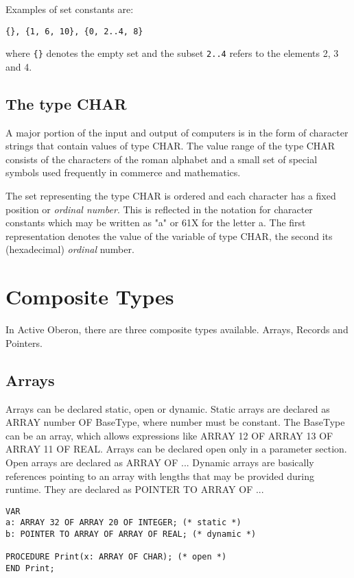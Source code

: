 \documentclass[a4paper,11pt]{article}
\begin{document}
Examples of set constants are:
\begin{lstlisting}[language=Oberon,frame=none]
{}, {1, 6, 10}, {0, 2..4, 8}
\end{lstlisting}

where \verb+{}+ denotes the empty set and the subset \verb+2..4+ refers to the elements 2, 3 and 4.

\subsection{The type CHAR}
A major portion of the input and output of computers is in the form of character strings that contain values of type CHAR. The value range of the type CHAR consists of the characters of the roman alphabet and a small set of special symbols used frequently in commerce and mathematics.

The set representing the type CHAR is ordered and each character has a fixed position or {\em ordinal number}. This is reflected in the notation for character constants which may be written as "a" or 61X for the letter a. The first representation denotes the value of the variable of type CHAR, the second its (hexadecimal) {\em ordinal} number.

\section{Composite Types}\label{section:CompositeTypes}

In Active Oberon, there are three composite types available. Arrays, Records and Pointers.

\subsection{Arrays}
Arrays can be declared static, open or dynamic. Static arrays are declared as ARRAY number OF BaseType, where number must be constant. The BaseType can be an array, which allows expressions like ARRAY 12 OF ARRAY 13 OF ARRAY 11 OF REAL. Arrays can be declared open only in a parameter section. Open arrays are declared as ARRAY OF ...  Dynamic arrays are basically references pointing to an array with lengths that may be provided during runtime. They are declared as POINTER TO ARRAY OF ...
\begin{lstlisting}[language=Oberon,frame=none]
VAR
a: ARRAY 32 OF ARRAY 20 OF INTEGER; (* static *)
b: POINTER TO ARRAY OF ARRAY OF REAL; (* dynamic *)

PROCEDURE Print(x: ARRAY OF CHAR); (* open *)
END Print;
\end{lstlisting}
\end{document}

